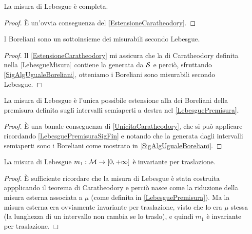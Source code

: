 \begin{remark}\label{LebesgueCompletezza}
	La misura di Lebesgue è completa.
\end{remark}
\begin{proof}
	È un'ovvia conseguenza del \cref{EstensioneCaratheodory}.
\end{proof}

\begin{proposition}
	I Boreliani sono un sottoinsieme dei misurabili secondo Lebesgue.
\end{proposition}
\begin{proof}
	Il \cref{EstensioneCaratheodory} mi assicura che la \sigalg{} di Caratheodory definita nella \cref{LebesgueMisura} contiene la \sigalg{} generata da $\S$ e perciò, sfruttando \cref{SigAlgUgualeBoreliani}, otteniamo i Boreliani sono misurabili secondo Lebesgue.
\end{proof}

\begin{proposition}
	La misura di Lebesgue è l'unica possibile estensione alla \sigalg{} dei Boreliani della premisura definita sugli intervalli semiaperti a destra nel \cref{LebesguePremisura}.
\end{proposition}
\begin{proof}
	È una banale conseguenza di \cref{UnicitaCaratheodory}, che si può applicare ricordando \cref{LebesguePremisuraSigFin} e notando che la \sigalg{} generata dagli intervalli semiaperti sono i Boreliani come mostrato in \cref{SigAlgUgualeBoreliani}.
\end{proof}

\begin{remark}\label{LebesgueInvarianteTraslazione}
	La misura di Lebesgue $m_1:\M\to\Rpiu$ è invariante per traslazione.
\end{remark}
\begin{proof}
	È sufficiente ricordare che la misura di Lebesgue è stata costruita appplicando il teorema di Caratheodory e perciò nasce come la riduzione della misura esterna associata a $\mu$ (come definita in \cref{LebesguePremisura}). Ma la misura esterna era ovviamente invariante per traslazione, visto che lo era $\mu$ stessa (la lunghezza di un intervallo non cambia se lo traslo), e quindi $m_1$ è invariante per traslazione.
\end{proof}

